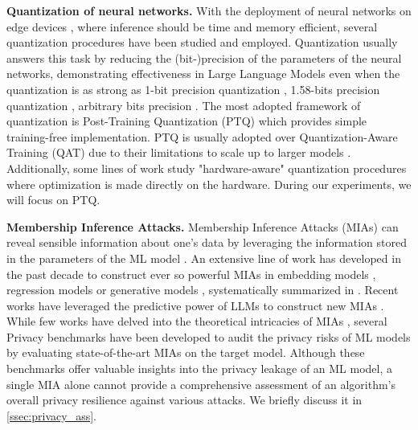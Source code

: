 \textbf{Quantization of neural networks.} With the deployment of neural networks on edge devices \cite{yuan2024vit, lin2024awq}, where inference should be time and memory efficient, several quantization procedures have been studied and employed. Quantization usually answers this task by reducing the (bit-)precision of the parameters of the neural networks, demonstrating effectiveness in Large Language Models \cite{gong2024survey, zhu2024survey} even when the quantization is as strong as 1-bit precision quantization \cite{wang2023bitnet, ma2024fbi}, 1.58-bits precision quantization \cite{ma2024era1bitllmslarge}, arbitrary bits precision \cite{zeng2024abq}.
The most adopted framework of quantization is Post-Training Quantization (PTQ) \cite{jacob2018quantization, nagel2019data, gholami2022survey} which provides simple training-free implementation. PTQ is usually adopted over Quantization-Aware Training (QAT) \cite{bengio2013estimating, banner2018scalable, nagel2021white, nagel2022overcoming, pang2024push} due to their limitations to scale up to larger models \cite{gholami2022survey, lin2024awq}. Additionally, some lines of work study "hardware-aware" quantization procedures \cite{wang2024ladder, balaskas2024hardware} where optimization is made directly on the hardware. During our experiments, we will focus on PTQ.



\textbf{Membership Inference Attacks.}
Membership Inference Attacks (MIAs) can reveal sensible information \cite{shokri2017membership, song2017machine,carlini2022membership, carlini2023extracting} about one's data by leveraging the information stored in the parameters of the ML model \cite{hartley2022measuring, del2023bounding}. An extensive line of work has developed in the past decade to construct ever so powerful MIAs in embedding models \cite{song2020information}, regression models \cite{gupta2021membership} or generative models \cite{hayes202588705membership}, systematically summarized in \cite{hu2022membership}. Recent works have leveraged the predictive power of LLMs to construct new MIAs \cite{staab2023beyond, wang2025survey}. While few works have delved into the theoretical intricacies of MIAs \cite{sablayrolles2019white, del2023bounding, aubinais2023fundamental}, several Privacy benchmarks have been developed to audit the privacy risks of ML models \cite{murakonda2020ml, liu2022ml} by evaluating state-of-the-art MIAs on the target model. Although these benchmarks offer valuable insights into the privacy leakage of an ML model, a single MIA alone cannot provide a comprehensive assessment of an algorithm's overall privacy resilience against various attacks. We briefly discuss it in \autoref{ssec:privacy_ass}. 

